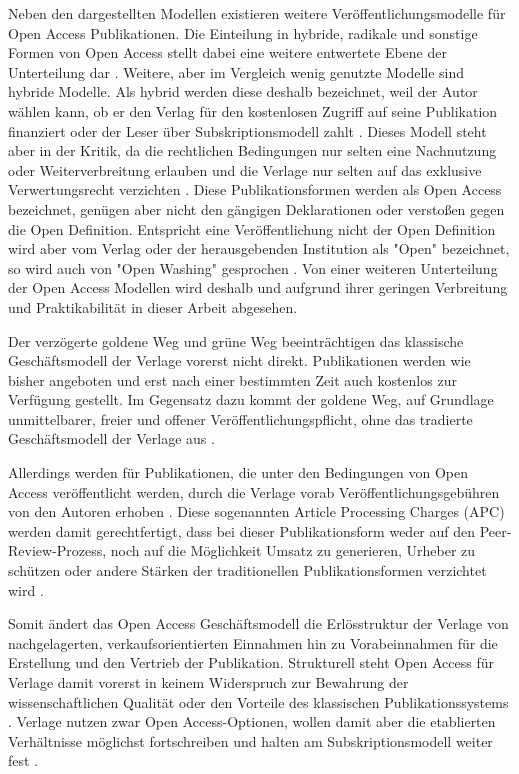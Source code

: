 Neben den dargestellten Modellen existieren weitere Veröffentlichungsmodelle für Open Access Publikationen. Die Einteilung in hybride, radikale und sonstige Formen von Open Access stellt dabei eine weitere entwertete Ebene der Unterteilung dar \cite{Mounce_2015}. Weitere, aber im Vergleich wenig genutzte Modelle sind hybride Modelle. Als hybrid werden diese deshalb bezeichnet, weil der Autor wählen kann, ob er den Verlag für den kostenlosen Zugriff auf seine Publikation finanziert oder der Leser über Subskriptionsmodell zahlt \cite{muller_2010_open}. Dieses Modell steht aber in der Kritik, da die rechtlichen Bedingungen nur selten eine Nachnutzung oder Weiterverbreitung erlauben und die Verlage nur selten auf das exklusive Verwertungsrecht verzichten \cite{muller_2010_open}. Diese Publikationsformen werden als Open Access bezeichnet, genügen aber nicht den gängigen Deklarationen \cite{boai_2012} oder verstoßen gegen die Open Definition. Entspricht eine Veröffentlichung nicht der Open Definition wird aber vom Verlag oder der herausgebenden Institution als "Open" bezeichnet, so wird auch von "Open Washing" gesprochen \cite{suchen}. Von einer weiteren Unterteilung der Open Access Modellen wird deshalb und aufgrund ihrer geringen Verbreitung und Praktikabilität in dieser Arbeit abgesehen.

Der verzögerte goldene Weg und grüne Weg beeinträchtigen das klassische Geschäftsmodell der Verlage vorerst nicht direkt. Publikationen werden wie bisher angeboten und erst nach einer bestimmten Zeit auch kostenlos zur Verfügung gestellt. Im Gegensatz dazu kommt der goldene Weg, auf Grundlage unmittelbarer, freier und offener Veröffentlichungspflicht, ohne das tradierte Geschäftsmodell der Verlage aus \cite{lewis_2012_inevitability}.

Allerdings werden für Publikationen, die unter den Bedingungen von Open Access veröffentlicht werden, durch die Verlage vorab Veröffentlichungsgebühren von den Autoren erhoben \cite{suchen}. Diese sogenannten Article Processing Charges (APC) werden damit gerechtfertigt, dass bei dieser Publikationsform weder auf den Peer-Review-Prozess, noch auf die Möglichkeit Umsatz zu generieren, Urheber zu schützen oder andere Stärken der traditionellen Publikationsformen verzichtet wird \cite{albert_2006_open_implications} \cite{Open_Access_net_2009}.

Somit ändert das Open Access Geschäftsmodell die Erlösstruktur der Verlage von nachgelagerten, verkaufsorientierten Einnahmen hin zu Vorabeinnahmen für die Erstellung und den Vertrieb der Publikation. Strukturell steht Open Access für Verlage damit vorerst in keinem Widerspruch zur Bewahrung der wissenschaftlichen Qualität oder den Vorteile des klassischen Publikationssystems \cite{Suber_2002}. Verlage nutzen zwar Open Access-Optionen, wollen damit aber die etablierten Verhältnisse möglichst fortschreiben und halten am Subskriptionsmodell weiter fest \cite{schmidt_2007_goldenen}.

